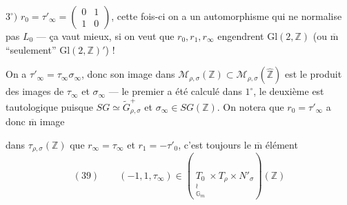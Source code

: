 $3^\circ)$ $r_0=\tau'_\infty=\begin{pmatrix}0&1\\1&0\end{pmatrix}$, cette fois-ci on a un automorphisme  qui ne normalise pas $L_0$ --- ça vaut mieux, si on veut que $r_0,r_1,r_\infty$ engendrent $\mathrm{Gl}(2,\mathbb Z)$ (ou $\overline{\mathrm m}$ ``seulement'' $\mathrm{Gl}(2,\mathbb Z)'$) !

On a $\tau'_\infty=\tau_\infty\sigma_\infty$, donc son image dans $\mathcal M_{\rho,\sigma}(\mathbb Z)\subset\mathcal M_{\rho,\sigma}(\widehat{\mathbb Z})$ est  le produit des images de $\tau_\infty$ et $\sigma_\infty$ --- le premier a été calculé dans $1^\circ$, le deuxième est tautologique puisque $SG\simeq\widetilde G_{\rho,\sigma}^{+}$ et $\sigma_\infty\in SG(\mathbb Z)$. On notera que  $r_0=\tau'_\infty$ a donc $\overline{\mathrm m}$ image


dans $\tau_{\rho,\sigma}(\mathbb Z)$ que $r_\infty=\tau_\infty$ et $r_1=-\tau'_0$, c'est toujours le $\overline{\mathrm m}$ élément 
\[
(39)\qquad (-1,1,\tau_\infty)\in
\left(\underset{\substack{\wr\\\mathbb G_m}}{T_0}\times T_\rho\times N'_\sigma\right)(\mathbb Z)
\]

